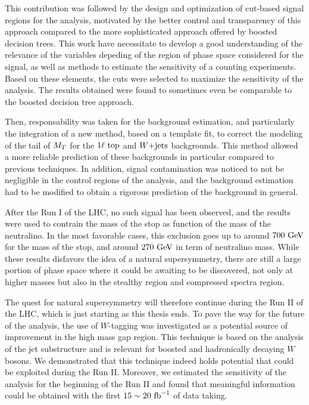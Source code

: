 This contribution was followed by the design and optimization of cut-based signal regions
for the analysis, motivated by the better control and transparency of this approach
compared to the more sophisticated approach offered by boosted decision trees.
This work have necessitate to develop a good understanding of the relevance of the
variables depeding of the region of phase space considered for the signal, as well as methods
to estimate the sensitivity of a counting experiments. Based on these elements, the
cuts were selected to maximize the sensitivity of the analysis. The results obtained
were found to sometimes even be comparable to the boosted decision tree approach.

Then, responsability was taken for the background estimation, and particularly the integration
of a new method, based on a template fit, to correct the modeling of the tail of $M_T$ for
the $1\ell~\text{top}$ and $\text{$W$+jets}$ backgrounds. This method allowed a more reliable prediction
of these backgrounds in particular compared to previous techniques. In addition, signal
contamination was noticed to not be negligible in the control regions of the analysis,
and the background estimation had to be modified to obtain a rigorous prediction of the
background in general.

After the Run I of the LHC, no such signal has been observed, and the results were used
to contrain the mass of the stop as function of the mass of the neutralino. In the
most favorable cases, this exclusion goes up to around $700~\text{GeV}$ for the mass of the stop,
and around $270~\text{GeV}$ in term of neutralino mass. While these results disfavors the idea of
a natural supersymmetry, there are still a large portion of phase space where it could be
awaiting to be discovered, not only at higher masses but also in the stealthy region and
compressed spectra region.

The quest for natural supersymmetry will therefore continue during the Run II of the LHC,
which is just starting as this thesis ends. To pave the way for the future
of the analysis, the use of $W$-tagging was investigated as a potential source of improvement
in the high mass gap region. This technique is based on the analysis of the jet substructure
and is relevant for boosted and hadronically decaying $W$ bosons. We demonstrated that
this technique indeed holds potential that could be exploited during the Run II. Moreover,
we estimated the sensitivity of the analysis for the beginning of the Run II and found
that meaningful information could be obtained with the first $15\sim20~\text{fb}^{-1}$ of data taking.


